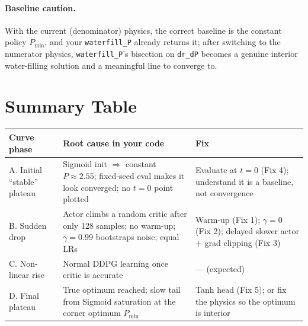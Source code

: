 \documentclass[11pt]{article}
\begin{document}
\paragraph{Baseline caution.} With the current (denominator) physics, the correct
baseline is the constant policy $P_{\min}$, and your \texttt{waterfill\_P} already
returns it; after switching to the numerator physics, \texttt{waterfill\_P}'s
bisection on \texttt{dr\_dP} becomes a genuine interior water-filling solution and a
meaningful line to converge to.

\section{Summary Table}

\begin{center}\small
\begin{tabular}{p{28mm}p{52mm}p{52mm}}
\toprule
\textbf{Curve phase} & \textbf{Root cause in your code} & \textbf{Fix}\\
\midrule
A. Initial ``stable'' plateau & Sigmoid init $\Rightarrow$ constant $P\approx2.55$;
fixed-seed eval makes it look converged; no $t{=}0$ point plotted &
Evaluate at $t=0$ (Fix 4); understand it is a baseline, not convergence\\[1mm]
B. Sudden drop & Actor climbs a random critic after only 128 samples; no warm-up;
$\gamma=0.99$ bootstraps noise; equal LRs & Warm-up (Fix 1); $\gamma=0$ (Fix 2);
delayed slower actor + grad clipping (Fix 3)\\[1mm]
C. Non-linear rise & Normal DDPG learning once critic is accurate & --- (expected)\\[1mm]
D. Final plateau & True optimum reached; slow tail from Sigmoid saturation at the
corner optimum $P_{\min}$ & Tanh head (Fix 5); or fix the physics so the optimum is
interior\\
\bottomrule
\end{tabular}
\end{center}
\end{document}

